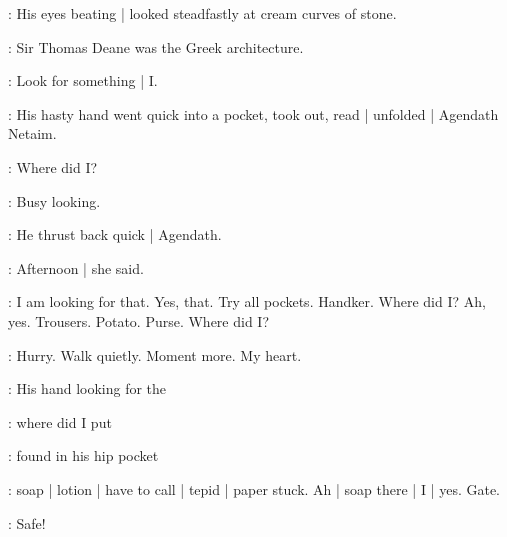 :
His eyes beating |
looked steadfastly at cream curves of stone.

\BloomInt:
Sir Thomas Deane was the Greek architecture.


\BloomInt:
Look for something |
I.

:
His hasty hand went quick into a pocket,
took out,
read |
unfolded |
Agendath Netaim.

\BloomInt:
Where did I?

\BloomInt:
Busy looking.

:
He thrust back quick |
Agendath.

\BloomInt:
Afternoon |
she said.

\BloomInt:
I am looking for that.
Yes, that.
Try all pockets.
Handker.
Where did I?
Ah, yes.
Trousers.
Potato.
Purse.
Where did I?

\BloomInt:
Hurry.
Walk quietly.
Moment more.
My heart.

:
His hand looking for the

\BloomInt:
where did I put

:
found in his hip pocket

\BloomInt:
soap |
lotion |
have to call |
tepid |
paper stuck.
Ah |
soap there |
I |
yes.
Gate.

\BloomInt:
Safe!

